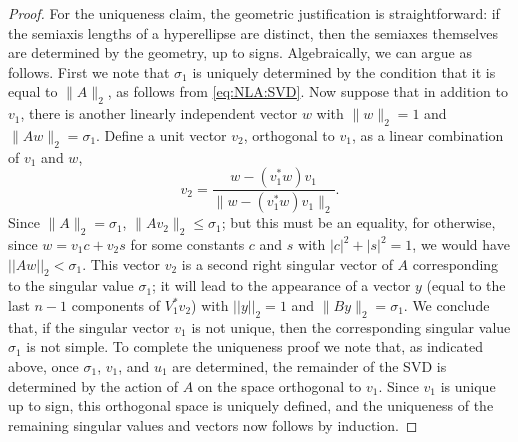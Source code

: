 \begin{proof}
For the uniqueness claim, the geometric justification is straightforward: if the semiaxis lengths of a hyperellipse are distinct, then the semiaxes themselves are determined by the geometry, up to signs.  Algebraically, we can argue as follows.  First we note that $\sigma_1$ is uniquely determined by the condition that it is equal to $\|A\|_2$, as follows from \eqref{eq:NLA:SVD}.  Now suppose that in addition to $v_1$, there is another linearly independent vector $w$ with $\|w\|_2=1$ and $\|Aw\|_2=\sigma_1$.  Define a unit vector $v_2$, orthogonal to $v_1$, as a linear combination of  $v_1$ and $w$,
\[
v_2=\frac{w-(v_1^*w)v_1}{\|w-(v_1^*w)v_1\|_2}.
\]
Since $\|A\|_2=\sigma_1$, $\|Av_2\|_2\leq\sigma_1$; but this must be an equality, for otherwise, since $w=v_1c+v_2s$ for some constants $c$ and $s$ with $|c|^2+|s|^2=1$, we would have $||Aw||_2<\sigma_1$.  This vector $v_2$ is a second right singular vector of $A$ corresponding to the singular value $\sigma_1$; it will lead to the appearance of a vector $y$ (equal to the last $n-1$ components of $V_1^*v_2$) with $||y||_2=1$ and $\|By\|_2=\sigma_1$.  We conclude that, if the singular vector $v_1$ is not unique, then the corresponding singular value $\sigma_1$ is not simple.  To complete the uniqueness proof we note that, as indicated above, once $\sigma_1$, $v_1$, and $u_1$ are determined, the remainder of the SVD is determined by the action of $A$ on the space orthogonal to $v_1$.  Since $v_1$ is unique up to sign, this orthogonal space is uniquely defined, and the uniqueness of the remaining singular values and vectors now follows by induction.
\end{proof}